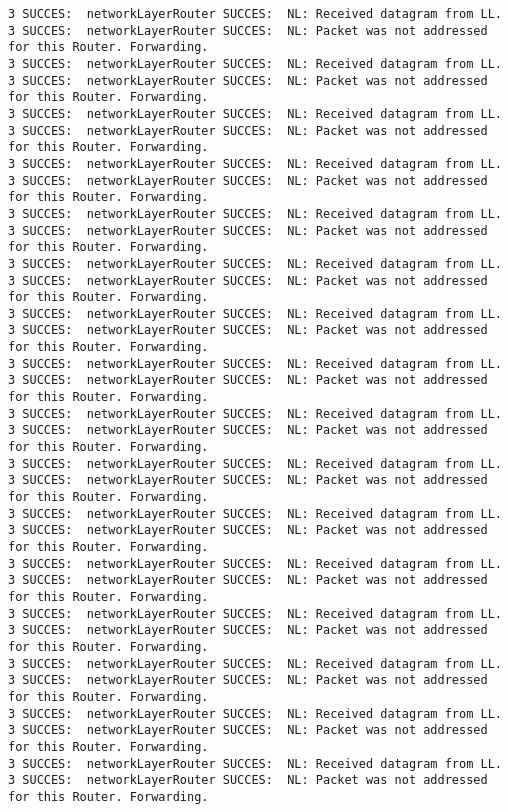 \begin{lstlisting}[breaklines=true]
3 SUCCES:  networkLayerRouter SUCCES:  NL: Received datagram from LL.
3 SUCCES:  networkLayerRouter SUCCES:  NL: Packet was not addressed for this Router. Forwarding.
3 SUCCES:  networkLayerRouter SUCCES:  NL: Received datagram from LL.
3 SUCCES:  networkLayerRouter SUCCES:  NL: Packet was not addressed for this Router. Forwarding.
3 SUCCES:  networkLayerRouter SUCCES:  NL: Received datagram from LL.
3 SUCCES:  networkLayerRouter SUCCES:  NL: Packet was not addressed for this Router. Forwarding.
3 SUCCES:  networkLayerRouter SUCCES:  NL: Received datagram from LL.
3 SUCCES:  networkLayerRouter SUCCES:  NL: Packet was not addressed for this Router. Forwarding.
3 SUCCES:  networkLayerRouter SUCCES:  NL: Received datagram from LL.
3 SUCCES:  networkLayerRouter SUCCES:  NL: Packet was not addressed for this Router. Forwarding.
3 SUCCES:  networkLayerRouter SUCCES:  NL: Received datagram from LL.
3 SUCCES:  networkLayerRouter SUCCES:  NL: Packet was not addressed for this Router. Forwarding.
3 SUCCES:  networkLayerRouter SUCCES:  NL: Received datagram from LL.
3 SUCCES:  networkLayerRouter SUCCES:  NL: Packet was not addressed for this Router. Forwarding.
3 SUCCES:  networkLayerRouter SUCCES:  NL: Received datagram from LL.
3 SUCCES:  networkLayerRouter SUCCES:  NL: Packet was not addressed for this Router. Forwarding.
3 SUCCES:  networkLayerRouter SUCCES:  NL: Received datagram from LL.
3 SUCCES:  networkLayerRouter SUCCES:  NL: Packet was not addressed for this Router. Forwarding.
3 SUCCES:  networkLayerRouter SUCCES:  NL: Received datagram from LL.
3 SUCCES:  networkLayerRouter SUCCES:  NL: Packet was not addressed for this Router. Forwarding.
3 SUCCES:  networkLayerRouter SUCCES:  NL: Received datagram from LL.
3 SUCCES:  networkLayerRouter SUCCES:  NL: Packet was not addressed for this Router. Forwarding.
3 SUCCES:  networkLayerRouter SUCCES:  NL: Received datagram from LL.
3 SUCCES:  networkLayerRouter SUCCES:  NL: Packet was not addressed for this Router. Forwarding.
3 SUCCES:  networkLayerRouter SUCCES:  NL: Received datagram from LL.
3 SUCCES:  networkLayerRouter SUCCES:  NL: Packet was not addressed for this Router. Forwarding.
3 SUCCES:  networkLayerRouter SUCCES:  NL: Received datagram from LL.
3 SUCCES:  networkLayerRouter SUCCES:  NL: Packet was not addressed for this Router. Forwarding.
3 SUCCES:  networkLayerRouter SUCCES:  NL: Received datagram from LL.
3 SUCCES:  networkLayerRouter SUCCES:  NL: Packet was not addressed for this Router. Forwarding.
3 SUCCES:  networkLayerRouter SUCCES:  NL: Received datagram from LL.
3 SUCCES:  networkLayerRouter SUCCES:  NL: Packet was not addressed for this Router. Forwarding.

\end{lstlisting}
